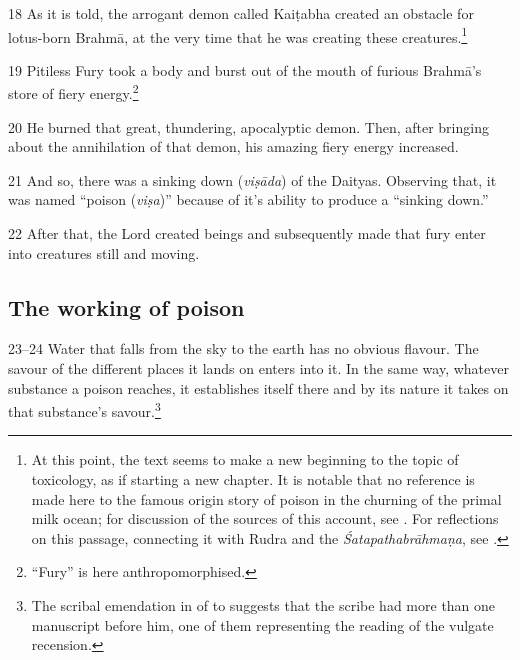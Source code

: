 \begin{translation}[resume]  

\item
 [18]  As it is told, the arrogant  demon called Kaiṭabha  created an obstacle for 
 lotus-born Brahmā, at  the very time that he  was creating these  
 creatures.\footnote{At  this point, the text  seems to make a new  beginning to 
 the topic  of toxicology, as if  starting a new  chapter.  It is notable  that no 
 reference is  made here to  the famous origin  story of poison in the  churning 
 of the primal  milk ocean; for  discussion of the  sources of this  account, see  
 \cite{bede-1967}. For reflections on this  passage, connecting it  with Rudra 
 and the  \emph{Śatapathabrāhmaṇa},  see  \cite{mana-2019}.}  

\item
[19] Pitiless Fury took a  body and burst out of  the mouth of furious  Brahmā's 
store of fiery  energy.\footnote{“Fury”  is here  anthropomorphised.}  

\item
[20]  He burned that  great, thundering,  apocalyptic  demon. Then,  after 
bringing about the annihilation of  that demon, his  amazing fiery  energy 
increased.  

\item
 [21]  And so, there was a  sinking down  (\emph{viṣāda}) of  the Daityas.  
 Observing that, it was named  “poison  (\emph{viṣa})”  because of it's  ability 
 to produce a  “sinking down.”  

\item
 [22] After  that, the Lord  created beings and  subsequently made  that fury 
 enter into creatures  still and moving.  

\subsection{The working of poison}

\item
 [23--24]  Water that falls  from the sky to the  earth has no  obvious flavour. 
 The savour of the  different places it  lands on enters into  it.  In the same way, 
 whatever substance  a poison reaches, it  establishes itself  there and by its  
 nature it  takes on that  substance's  savour.\footnote{The  scribal emendation  
 in   of    to    
 suggests that the  scribe had more  than  one manuscript  before him, one  of 
 them  representing the  reading of the  vulgate  recension.}  


\end{translation}

